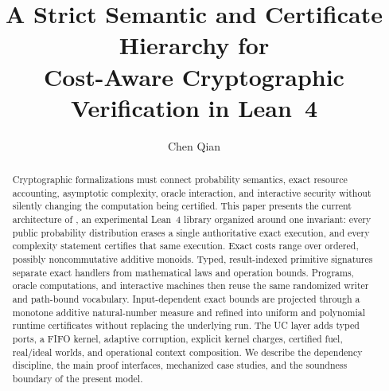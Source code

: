 \documentclass[runningheads]{llncs}
\begin{document}
\title{A Strict Semantic and Certificate Hierarchy for\texorpdfstring{\\}{ }
Cost-Aware Cryptographic Verification in Lean~4}
\author{Chen Qian}
\institute{}
\maketitle

\begin{abstract}
  Cryptographic formalizations must connect probability semantics, exact
  resource accounting, asymptotic complexity, oracle interaction, and
  interactive security without silently changing the computation being
  certified.  This paper presents the current architecture of \LeanCrypto, an
  experimental Lean~4 library organized around one invariant: every public
  probability distribution erases a single authoritative exact execution, and
  every complexity statement certifies that same execution.  Exact costs range
  over ordered, possibly noncommutative additive monoids.  Typed,
  result-indexed primitive signatures separate exact handlers from mathematical
  laws and operation bounds.  Programs, oracle computations, and interactive
  machines then reuse the same randomized writer and path-bound vocabulary.
  Input-dependent exact bounds are projected through a monotone additive
  natural-number measure and refined into uniform and polynomial runtime
  certificates without replacing the underlying run.  The UC layer adds typed
  ports, a FIFO kernel, adaptive corruption, explicit kernel charges,
  certified fuel, real/ideal worlds, and operational context composition.  We
  describe the dependency discipline, the main proof interfaces, mechanized
  case studies, and the soundness boundary of the present model.

\end{abstract}













\end{document}
